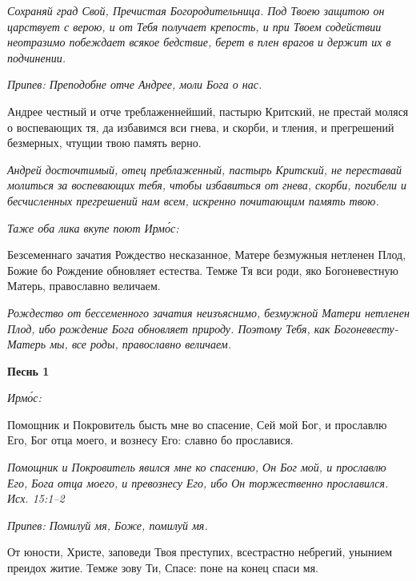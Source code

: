 \itshape Сохраняй град Свой, Пречистая Богородительница. Под Твоею защитою он царствует с верою, и от Тебя получает крепость, и при Твоем содействии неотразимо побеждает всякое бедствие, берет в плен врагов и держит их в подчинении.\normalfont{}


\itshape Припев:\normalfont{} Преподобне отче Андрее, моли Бога о нас.


Андрее честный и отче треблаженнейший, пастырю Критский, не престай моляся о воспевающих тя, да избавимся вси гнева, и скорби, и тления, и прегрешений безмерных, чтущии твою память верно.


\itshape Андрей досточтимый, отец преблаженный, пастырь Критский, не переставай молиться за воспевающих тебя, чтобы избавиться от гнева, скорби, погибели и бесчисленных прегрешений нам всем, искренно почитающим память твою.\normalfont{}


\itshape Таже оба лика вкупе поют Ирмо́с:\normalfont{}


Безсеменнаго зачатия Рождество несказанное, Матере безмужныя нетленен Плод, Божие бо Рождение обновляет естества. Темже Тя вси роди, яко Богоневестную Матерь, православно величаем.


\itshape Рождество от бессеменного зачатия неизъяснимо, безмужной Матери нетленен Плод, ибо рождение Бога обновляет природу. Поэтому Тебя, как Богоневесту-Матерь мы, все роды, православно величаем.\normalfont{}

\mychapterending

 






\bfseries Песнь 1\normalfont{}


\itshape Ирмо́с:\normalfont{}


Помощник и Покровитель бысть мне во спасение, Сей мой Бог, и прославлю Его, Бог отца моего, и вознесу Его: славно бо прославися.


\itshape Помощник и Покровитель явился мне ко спасению, Он Бог мой, и прославлю Его, Бога отца моего, и превознесу Его, ибо Он торжественно прославился. Исх. 15:1–2\normalfont{}


\itshape Припев:\normalfont{} Помилуй мя, Боже, помилуй мя.


От юности, Христе, заповеди Твоя преступих, всестрастно небрегий, унынием преидох житие. Темже зову Ти, Спасе: поне на конец спаси мя.



